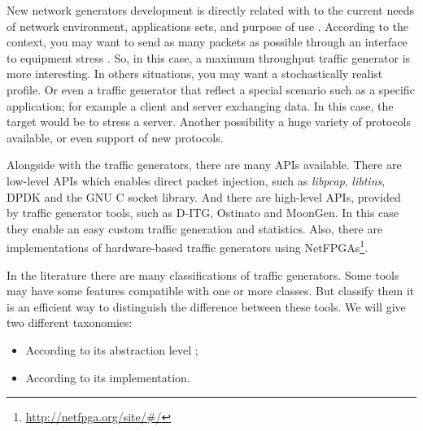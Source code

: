 
New network generators development is directly related with to the current needs of network environment, applications sets, and purpose of use \cite{validate-trafficgen}. According to the context, you may want to send as many packets as possible through an interface to  equipment stress . So, in this case, a maximum throughput traffic generator is more interesting. In others situations, you may want a stochastically realist profile. Or even a traffic generator that reflect a special scenario such as a specific application; for example a client and server exchanging data\cite{surge-paper}. In this case, the target would be to stress a server. Another possibility a huge variety of protocols available, or even support of new protocols.

Alongside with the traffic generators, there are many APIs available. There are low-level APIs which enables direct packet injection, such as \textit{libpcap}\cite{web-tcpdump}, \textit{libtins}\cite{web-libtins}, DPDK\cite{web-dpdk} and the GNU C socket library\cite{web-socket}. And there are high-level APIs, provided by traffic generator tools, such as D-ITG\cite{ditg-paper}, Ostinato\cite{web-ostinato} and MoonGen\cite{moongen-paper}. In this case they enable an easy custom traffic generation and statistics. Also, there are implementations of hardware-based traffic generators using NetFPGAs\footnote{\href{http://netfpga.org/site/\#/}{http://netfpga.org/site/\#/}}.

In the literature there are many classifications of traffic generators\cite{sourcesonoff-paper}\cite{hybrid-traffic-gen}\cite{validate-trafficgen}\cite{do-you-trust}. Some tools may have some features compatible with one or more classes. But classify them it is an efficient way to distinguish the difference between these tools. We will give two different taxonomies:

\begin{itemize}
\item According to its abstraction level \cite{do-you-trust};
\item According to its implementation.
\end{itemize}


